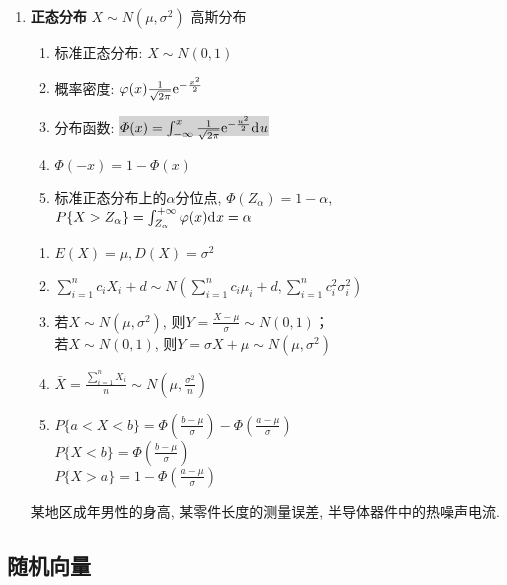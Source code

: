 \begin{enumerate}
\item {\bf 正态分布} $X\sim N(\mu,\sigma^2)$ 高斯分布\\
\begin{enumerate}
\item 标准正态分布: $X\sim N(0,1)$
\item 概率密度: $\varphi(x)\frac{1}{\sqrt{2\pi}}{\mathrm{e}}^{-\frac{x^2}{2}}$
\item 分布函数: \colorbox{lightgray}{$\varPhi(x)=\int_{-\infty}^{x}\frac{1}{\sqrt{2\pi}}{\mathrm{e}}^{-\frac{u^2}{2}}{\mathrm{d}\:\!} u$}
\item $\varPhi(-x)=1-\varPhi(x)$
\item 标准正态分布上的$\alpha$分位点, $\varPhi(Z_\alpha)=1-\alpha$, \\$P\{X>Z_\alpha\}=\int_{Z_\alpha}^{+\infty}\varphi(x){\mathrm{d}\:\!} x=\alpha$
\end{enumerate}
\begin{enumerate}[label={\sf 性质\arabic*}]
\item $E(X)=\mu, D(X)=\sigma^2$
\item $\sum_{i=1}^{n}c_iX_i+d\sim N\left(\sum_{i=1}^{n}c_i\mu_i+d,\sum_{i=1}^{n}c_i^2\sigma_i^2\right)$
\item 若$X\sim N(\mu,\sigma^2)$, 则$Y=\frac{X-\mu}{\sigma}\sim N(0,1)$；\\
若$X\sim N(0,1)$, 则$Y=\sigma X+\mu\sim N(\mu,\sigma^2)$
\item $\bar{X}=\frac{\sum_{i=1}^{n}X_i}{n}\sim N(\mu, \frac{\sigma^2}{n})$
\item $P\{a<X<b\}=\varPhi (\frac{b-\mu}{\sigma} )-\varPhi (\frac{a-\mu}{\sigma} )$\\
$P\{X<b\}=\varPhi (\frac{b-\mu}{\sigma} )$\\
$P\{X>a\}=1-\varPhi (\frac{a-\mu}{\sigma} )$
\end{enumerate}
某地区成年男性的身高, 某零件长度的测量误差, 半导体器件中的热噪声电流.

\end{enumerate}

\subsection{随机向量}

